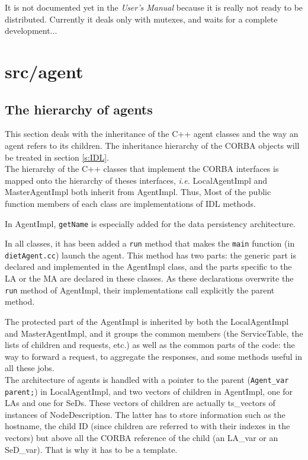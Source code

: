 It is not documented yet in the \textit{User's Manual} because it is really not
ready to be distributed. Currently it deals only with mutexes, and waits for a
complete development...



\section{\textsf{src/agent}}
\label{s:agent}

\subsection{The hierarchy of agents}

This section deals with the inheritance of the C++ agent classes and the way an
agent refers to its children. The inheritance hierarchy of the CORBA objects
will be treated in section \ref{s:IDL}.
\\

The hierarchy of the C++ classes that implement the CORBA interfaces is mapped
onto the hierarchy of theses interfaces, \emph{i.e.} \textsf{LocalAgentImpl} and
\textsf{MasterAgentImpl} both inherit from \textsf{AgentImpl}. Thus, Most of the
public function members of each class are implementations of IDL methods.

In \textsf{AgentImpl}, \texttt{getName} is especially added for the data
persistency architecture.

In all classes, it has been added a \texttt{run} method that makes the
\texttt{main} function (in \texttt{dietAgent.cc}) launch the agent. This method
has two parts: the generic part is declared and implemented in the
\textsf{AgentImpl} class, and the parts specific to the LA or the MA are
declared in these classes. As these declarations overwrite the \texttt{run}
method of \textsf{AgentImpl}, their implementations call explicitly the parent
method.

The protected part of the \textsf{AgentImpl} is inherited by both the
\textsf{LocalAgentImpl} and \textsf{MasterAgentImpl}, and it groups the common
members (the \textsf{ServiceTable}, the lists of children and requests, etc.) as
well as the common parts of the code: the way to forward a request, to aggregate
the responses, and some methods useful in all these jobs.
\\

The architecture of agents is handled with a pointer to the parent
(\verb+Agent_var parent;+) in \textsf{LocalAgentImpl}, and two vectors of children
in \textsf{AgentImpl}, one for LAs and one for SeDs. These vectors of children are
actually \textsf{ts\_vectors} of instances of \textsf{NodeDescription}. The
latter has to store information such as the hostname, the child ID (since
children are referred to with their indexes in the vectors) but above all the
CORBA reference of the child (an \textsf{LA\_var} or an \textsf{SeD\_var}). That
is why it has to be a template.


